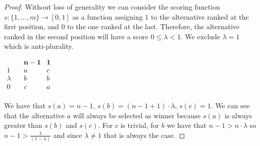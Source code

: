 \documentclass[version=3.21, pagesize, notitlepage, twoside=off, bibliography=totoc, DIV=calc, fontsize=12pt, a4paper]{scrartcl}
\begin{document}
\begin{proof} Without loss of generality we can consider the scoring function $s:\{1,\dots,m\}\rightarrow [0,1]$ as a function assigning $1$ to the alternative ranked at the first position, and $0$ to the one ranked at the last. Therefore, the alternative ranked in the second position will have a score $0 \leq \lambda<1$. We exclude $\lambda = 1$ which is anti-plurality.
	\begin{center}
		$
		\begin{array}{ccc}
		\quad & \mathbf{n-1} &\mathbf{1}\\
		1 \quad &a&c\\
		\lambda \quad &b&b\\
		0 \quad &c&a\\
		\end{array}
		$
	\end{center}
	We have that $s(a)=n-1$, $s(b)=(n-1+1)\cdot \lambda$, $s(c)=1$. We can see that the alternative $a$ will always be selected as winner because $s(a)$ is always greater than $s(b)$ and $s(c)$. For $c$ is trivial, for $b$ we have that $n-1>n\cdot\lambda$ so $n-1>\frac{\lambda}{(1-\lambda)}$ and since $\lambda \neq 1$ that is always the case.
\end{proof}
\end{document}
